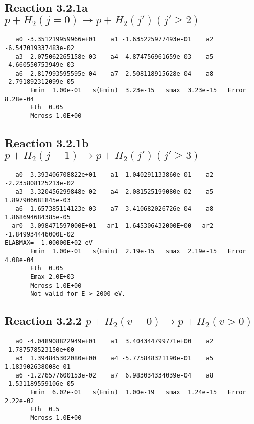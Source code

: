 \documentclass[12pt,dvipdfmx]{article}
\begin{document}
\newpage
\subsection{
Reaction 3.2.1a $   p + H_2(j=0) \rightarrow p + H_2(j')   (j' \geq 2)$}


\begin{small}\begin{verbatim}
   a0 -3.351219959966e+01    a1 -1.635225977493e-01    a2 -6.547019337483e-02
   a3 -2.075062265158e-03    a4 -4.874756961659e-03    a5 -4.660550753949e-03
   a6  2.817993595595e-04    a7  2.508118915628e-04    a8 -2.791892312099e-05
       Emin  1.00e-01   s(Emin)  3.23e-15   smax  3.23e-15   Error  8.28e-04
       Eth  0.05
       Mcross 1.0E+00
\end{verbatim}\end{small}







\newpage
\subsection{
Reaction 3.2.1b $   p + H_2(j=1) \rightarrow p + H_2(j')   (j' \geq 3)$}


\begin{small}\begin{verbatim}
   a0 -3.393406708822e+01    a1 -1.040291133860e-01    a2 -2.235808125213e-02
   a3 -3.320456299848e-02    a4 -2.081525199080e-02    a5  1.897906681845e-03
   a6  1.657385114123e-03    a7 -3.410682026726e-04    a8  1.868694684385e-05
  ar0 -3.098471597000E+01   ar1 -1.645306432000E+00   ar2 -1.849934446000E-02
ELABMAX=  1.00000E+02 eV
       Emin  1.00e-01   s(Emin)  2.19e-15   smax  2.19e-15   Error  4.08e-04
       Eth  0.05
       Emax 2.0E+03
       Mcross 1.0E+00
       Not valid for E > 2000 eV.
\end{verbatim}\end{small}


\newpage
\subsection{
Reaction 3.2.2 $   p + H_2(v=0) \rightarrow p + H_2(v > 0)$}


\begin{small}\begin{verbatim}
   a0 -4.048908822949e+01    a1  3.404344799771e+00    a2 -1.787578523150e+00
   a3  1.394845302080e+00    a4 -5.775848321190e-01    a5  1.183902638008e-01
   a6 -1.276577600153e-02    a7  6.983034334039e-04    a8 -1.531189559106e-05
       Emin  6.02e-01   s(Emin)  1.00e-19   smax  1.24e-15   Error  2.22e-02
       Eth  0.5
       Mcross 1.0E+00
\end{verbatim}\end{small}
\end{document}
